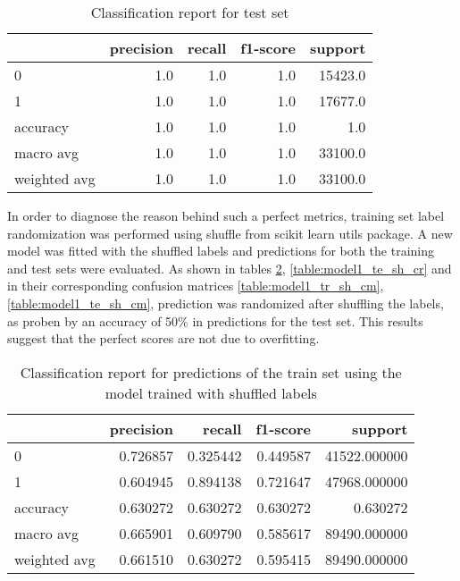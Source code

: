 \documentclass{article}
\begin{document}
{\begin{itemize}
\begin{table}[h!]
\centering
\begin{tabular}{lrrrr}
\toprule
{} &  precision &  recall &  f1-score &  support \\
\midrule
0            &        1.0 &     1.0 &       1.0 &  15423.0 \\
1            &        1.0 &     1.0 &       1.0 &  17677.0 \\
accuracy     &        1.0 &     1.0 &       1.0 &      1.0 \\
macro avg    &        1.0 &     1.0 &       1.0 &  33100.0 \\
weighted avg &        1.0 &     1.0 &       1.0 &  33100.0 \\
\bottomrule
\end{tabular}
\caption{Classification report for test set}
\label{table:model1_te_cr}
\end{table}

In order to diagnose the reason behind such a perfect metrics, training set label randomization was performed using shuffle from scikit learn utils package. A new model was fitted with the shuffled labels and predictions for both the training and test sets were evaluated. As shown in tables \ref{table:model1_tr_sh_cr}, \ref{table:model1_te_sh_cr} and in their corresponding confusion matrices  \ref{table:model1_tr_sh_cm}, \ref{table:model1_te_sh_cm}, prediction was randomized after shuffling the labels, as proben by an accuracy of  50\% in predictions for the test set. This results suggest that the perfect scores are not due to overfitting.
 
\begin{table}[h!]
\centering
\begin{tabular}{lrrrr}
\toprule
{} &  precision &    recall &  f1-score &       support \\
\midrule
0            &   0.726857 &  0.325442 &  0.449587 &  41522.000000 \\
1            &   0.604945 &  0.894138 &  0.721647 &  47968.000000 \\
accuracy     &   0.630272 &  0.630272 &  0.630272 &      0.630272 \\
macro avg    &   0.665901 &  0.609790 &  0.585617 &  89490.000000 \\
weighted avg &   0.661510 &  0.630272 &  0.595415 &  89490.000000 \\
\bottomrule
\end{tabular}
\caption{Classification report for predictions of the train set using the model trained with shuffled labels}
\label{table:model1_tr_sh_cr}
\end{table}


\end{itemize}}
\end{document}
